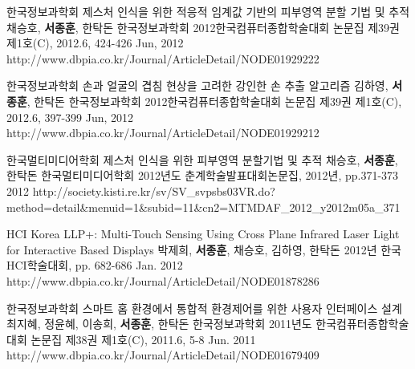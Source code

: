 \begin{cventries}
  \cvpublicationentry
    {한국정보과학회} %
    {제스처 인식을 위한 적응적 임계값 기반의 피부영역 분할 기법 및 추적} %
    {채승호, \textbf{서종훈}, 한탁돈} %
    {한국정보과학회 2012한국컴퓨터종합학술대회 논문집 제39권 제1호(C), 2012.6, 424-426}
    {Jun, 2012} %
    {http://www.dbpia.co.kr/Journal/ArticleDetail/NODE01929222}

  \cvpublicationentry
    {한국정보과학회} %
    {손과 얼굴의 겹침 현상을 고려한 강인한 손 추출 알고리즘} %
    {김하영, \textbf{서종훈}, 한탁돈} %
    {한국정보과학회 2012한국컴퓨터종합학술대회 논문집 제39권 제1호(C), 2012.6, 397-399}
    {Jun, 2012} %
    {http://www.dbpia.co.kr/Journal/ArticleDetail/NODE01929212}

  \cvpublicationentry
    {한국멀티미디어학회} %
    {제스처 인식을 위한 피부영역 분할기법 및 추적} %
    {채승호, \textbf{서종훈}, 한탁돈} %
    {한국멀티미디어학회 2012년도 춘계학술발표대회논문집, 2012년, pp.371-373}
    {2012} %
    {http://society.kisti.re.kr/sv/SV\_svpsbs03VR.do?method=detail\&menuid=1\&subid=11\&cn2=MTMDAF\_2012\_y2012m05a\_371}

  \cvpublicationentry
    {HCI Korea} %
    {LLP+: Multi-Touch Sensing Using Cross Plane Infrared Laser Light for Interactive Based Displays} %
    {박제희, \textbf{서종훈}, 채승호, 김하영, 한탁돈} %
    {2012년 한국 HCI학술대회, pp. 682-686}
    {Jan. 2012} %
    {http://www.dbpia.co.kr/Journal/ArticleDetail/NODE01878286} 

  \cvpublicationentry
    {한국정보과학회} %
    {스마트 홈 환경에서 통합적 환경제어를 위한 사용자 인터페이스 설계} %
    {최지혜, 정윤혜, 이송희, \textbf{서종훈}, 한탁돈} %
    {한국정보과학회 2011년도 한국컴퓨터종합학술대회 논문집 제38권 제1호(C), 2011.6, 5-8}
    {Jun. 2011} %
    {http://www.dbpia.co.kr/Journal/ArticleDetail/NODE01679409} 


\end{cventries}
